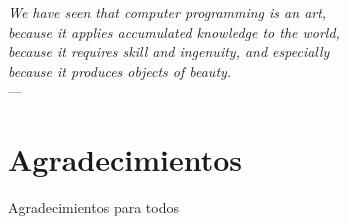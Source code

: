 
\begin{flushright}{\slshape
    We have seen that computer programming is an art, \\
    because it applies accumulated knowledge to the world, \\
    because it requires skill and ingenuity, and especially \\
    because it produces objects of beauty.} \\ \medskip
    ---  \citep{knuth:1974}
\end{flushright}



\bigskip

\begingroup
\let\clearpage\relax
\let\cleardoublepage\relax
\let\cleardoublepage\relax
\chapter*{Agradecimientos}
Agradecimientos para todos

\endgroup



